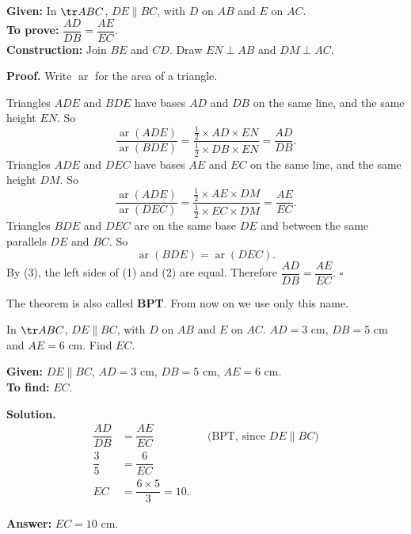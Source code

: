 \textbf{Given:} In $\tr ABC$, $DE\parallel BC$, with $D$ on $AB$ and $E$ on $AC$.\\
\textbf{To prove:} $\dfrac{AD}{DB}=\dfrac{AE}{EC}$.\\
\textbf{Construction:} Join $BE$ and $CD$. Draw $EN\perp AB$ and $DM\perp AC$.

\textbf{Proof.} Write $\operatorname{ar}$ for the area of a triangle.

Triangles $ADE$ and $BDE$ have bases $AD$ and $DB$ on the same line, and the same height $EN$. So
\[
\dfrac{\operatorname{ar}(ADE)}{\operatorname{ar}(BDE)}=\dfrac{\tfrac12\times AD\times EN}{\tfrac12\times DB\times EN}=\dfrac{AD}{DB}. \tag{1}
\]
Triangles $ADE$ and $DEC$ have bases $AE$ and $EC$ on the same line, and the same height $DM$. So
\[
\dfrac{\operatorname{ar}(ADE)}{\operatorname{ar}(DEC)}=\dfrac{\tfrac12\times AE\times DM}{\tfrac12\times EC\times DM}=\dfrac{AE}{EC}. \tag{2}
\]
Triangles $BDE$ and $DEC$ are on the same base $DE$ and between the same parallels $DE$ and $BC$. So
\[
\operatorname{ar}(BDE)=\operatorname{ar}(DEC). \tag{3}
\]
By (3), the left sides of (1) and (2) are equal. Therefore $\dfrac{AD}{DB}=\dfrac{AE}{EC}$. \hfill$\square$


The theorem is also called \textbf{BPT}. From now on we use only this name.

\begin{example}
In $\tr ABC$, $DE\parallel BC$, with $D$ on $AB$ and $E$ on $AC$. $AD=3$ cm, $DB=5$ cm and $AE=6$ cm. Find $EC$.


\textbf{Given:} $DE\parallel BC$, $AD=3$ cm, $DB=5$ cm, $AE=6$ cm.\\
\textbf{To find:} $EC$.

\textbf{Solution.}
\[
\begin{aligned}
\dfrac{AD}{DB}&=\dfrac{AE}{EC} &&\text{(BPT, since $DE\parallel BC$)}\\
\dfrac{3}{5}&=\dfrac{6}{EC}\\
EC&=\dfrac{6\times5}{3}=10.
\end{aligned}
\]

\textbf{Answer:} $EC=10$ cm.
\end{example}

